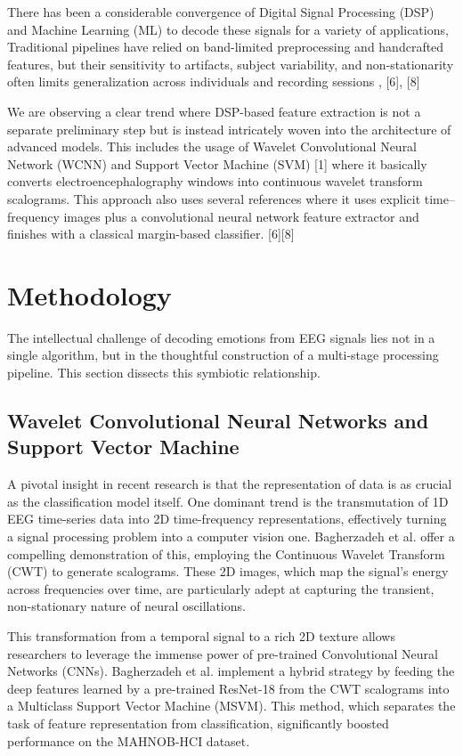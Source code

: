 \documentclass[conference]{IEEEtran}
\begin{document}
There has been a considerable convergence of Digital Signal Processing (DSP) and Machine Learning (ML) to decode these signals for a variety of applications, Traditional pipelines have relied on band-limited preprocessing and handcrafted features, but their sensitivity to artifacts, subject variability, and non-stationarity often limits generalization across individuals and recording sessions \cite{b3}, [6], [8] 

 We are observing a clear trend where DSP-based feature extraction is not a separate preliminary step but is instead intricately woven into the architecture of advanced models. This includes the usage of Wavelet Convolutional Neural Network (WCNN) and Support Vector Machine (SVM) [1] where it basically converts electroencephalography windows into continuous wavelet transform scalograms. This approach also uses several references where it uses explicit time–frequency images plus a convolutional neural network feature extractor and finishes with a classical margin-based classifier. [6][8]

\section{Methodology}
The intellectual challenge of decoding emotions from EEG signals lies not in a single algorithm, but in the thoughtful construction of a multi-stage processing pipeline. This section dissects this symbiotic relationship.

\subsection{Wavelet Convolutional Neural Networks and Support Vector Machine}
A pivotal insight in recent research is that the representation of data is as crucial as the classification model itself. One dominant trend is the transmutation of 1D EEG time-series data into 2D time-frequency representations, effectively turning a signal processing problem into a computer vision one. Bagherzadeh et al. \cite{b1} offer a compelling demonstration of this, employing the Continuous Wavelet Transform (CWT) to generate scalograms. These 2D images, which map the signal's energy across frequencies over time, are particularly adept at capturing the transient, non-stationary nature of neural oscillations.

This transformation from a temporal signal to a rich 2D texture allows researchers to leverage the immense power of pre-trained Convolutional Neural Networks (CNNs). Bagherzadeh et al. implement a hybrid strategy by feeding the deep features learned by a pre-trained ResNet-18 from the CWT scalograms into a Multiclass Support Vector Machine (MSVM). This method, which separates the task of feature representation from classification, significantly boosted performance on the MAHNOB-HCI dataset.
\end{document}
